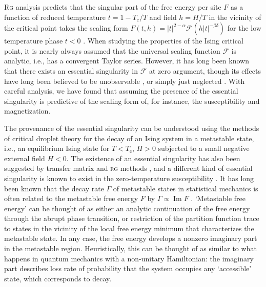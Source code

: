 \documentclass[aps,prl,reprint]{revtex4-1}
\def\im{\mathop{\mathrm{Im}}\nolimits}
\def\c{\mathrm c}
\def\fF{\mathcal F}  %
\begin{document}
\textsc{Rg} analysis predicts that the singular part of the free energy per
site $F$ as a function of reduced temperature $t=1-T_\c/T$ and field $h=H/T$
in the vicinity of the critical point takes the scaling form
$F(t,h)=|t|^{2-\alpha}\fF(h|t|^{-\beta\delta})$ for the low temperature phase
$t<0$ \cite{cardy.1996.scaling}. When studying the properties of the Ising
critical point, it is nearly always assumed that the universal scaling
function $\fF$ is analytic, i.e., has a convergent Taylor series. However, it
has long been known that there exists an essential singularity in $\fF$ at
zero argument, though its effects have long been believed to be unobservable
\cite{fisher.1967.condensation}, or simply just neglected
\cite{guida.1997.3dising,schofield.1969.parametric,schofield.1969.correlation,caselle.2001.critical,josephson.1969.equation,fisher.1999.trigonometric}.
With careful analysis, we have found that assuming the presence of the
essential singularity is predictive of the scaling form of, for instance, the
susceptibility and magnetization.

The provenance of the essential singularity can be understood using the
methods of critical droplet theory for the decay of an Ising system in a
metastable state, i.e., an equilibrium Ising state for $T<T_\c$, $H>0$
subjected to a small negative external field $H<0$. The existence of an
essential singularity has also been suggested by transfer matrix
\cite{mccraw.1978.metastability,enting.1980.investigation,mangazeev.2008.variational,mangazeev.2010.scaling} and \textsc{rg}
methods \cite{klein.1976.essential}, and a different kind of essential
singularity is known to exist in the zero-temperature susceptibility
\cite{orrick.2001.susceptibility,chan.2011.ising,guttmann.1996.solvability,nickel.1999.singularity,nickel.2000.addendum,assis.2017.analyticity}.  It has long been known that the decay
rate $\Gamma$ of metastable states in statistical mechanics is often related
to the metastable free energy $F$ by $\Gamma\propto\im F$
\cite{langer.1969.metastable,penrose.1987.rigorous,gaveau.1989.analytic,privman.1982.analytic}.
`Metastable free energy' can be thought of as either an analytic continuation
of the free energy through the abrupt phase transition, or restriction of the
partition function trace to states in the vicinity of the local free energy
minimum that characterizes the metastable state. In any case, the free energy
develops a nonzero imaginary part in the metastable region. Heuristically,
this can be thought of as similar to what happens in quantum mechanics with a
non-unitary Hamiltonian: the imaginary part describes loss rate of probability
that the system occupies any `accessible' state, which corresponds to decay.
\end{document}

